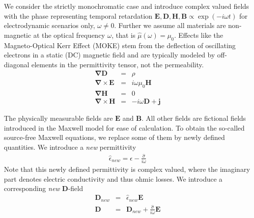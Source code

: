\documentclass[12pt,a4paper,twoside,openright,BCOR10mm,headsepline,titlepage,abstracton,chapterprefix,final]{scrreprt}
\newcommand\Vector[1]{{\mathbf{#1}}}
\newcommand\vacuum{0}
\newcommand\Nabla{\Vector{\nabla}}
\newcommand\Tensor[1]{\hat{#1}}
\newcommand\scalarEfield{E}
\newcommand\scalarBfield{B}
\newcommand\scalarHfield{H}
\newcommand\scalarDfield{D}
\newcommand\Efield{\Vector{\scalarEfield}}
\newcommand\Bfield{\Vector{\scalarBfield}}
\newcommand\Hfield{\Vector{\scalarHfield}}
\newcommand\Dfield{\Vector{\scalarDfield}}
\newcommand\permeability{\Tensor{\mu}}
\newcommand\vacuumpermeability{\mu_{\vacuum}}
\newcommand\permittivity{\Tensor{\epsilon}}
\newcommand\conductivity{\Tensor{\sigma}}
\newcommand\currentdensity{\Vector{j}}
\newcommand\chargedensity{\rho}
\begin{document}
We consider the strictly monochromatic case and introduce complex valued fields with the phase representing temporal retardation $\Efield,\Dfield,\Hfield,\Bfield \propto \exp(-i \omega t)$ for electrodynamic scenarios only, $\omega \neq 0$. 
Further we assume all materials are non-magnetic at the optical frequency $\omega$, that is $\permeability(\omega) = \vacuumpermeability$. 
Effects like the Magneto-Optical Kerr Effect (MOKE) stem from the deflection of oscillating electrons in a static (DC) magnetic field and are typically modeled by off-diagonal elements in the permittivity tensor, not the permeability.
\begin{subequations}
\begin{eqnarray}
  \Nabla \Dfield &=& \chargedensity 					\\
  \Nabla \times \Efield &=& i \omega \vacuumpermeability \Hfield	\\
  \Nabla \Hfield &=& 0  					\\
  \Nabla \times \Hfield &=& - i \omega \Dfield + \currentdensity  		
\end{eqnarray}
\end{subequations}

The physically measurable fields are $\Efield$ and $\Bfield$. All other fields are fictional fields introduced in the Maxwell model for ease of calculation.
To obtain the so-called source-free Maxwell equations, we replace some of them by newly defined quantities.
We introduce a \emph{new} permittivity
\begin{eqnarray}
  \permittivity_{new} = \permittivity - \frac{\conductivity}{i \omega}
\end{eqnarray}
Note that this newly defined permittivity is complex valued, where the imaginary part denotes electric conductivity and thus ohmic losses.
We introduce a corresponding \emph{new} $\Dfield$-field
\begin{eqnarray}
  \Dfield_{new} &=& \permittivity_{new} \Efield \\
  \Dfield &=& \Dfield_{new} + \frac{\conductivity}{i \omega} \Efield
\end{eqnarray}
\end{document}
